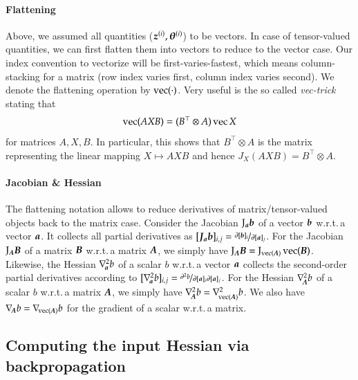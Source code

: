 
\paragraph{Flattening} Above, we assumed all quantities (${\boldsymbol{z}}^{(i)}, {\boldsymbol{\theta}}^{(i)}$) to be vectors.
In case of tensor-valued quantities, we can first flatten them into vectors to reduce to the vector case.
Our index convention to vectorize will be first-varies-fastest, which means column-stacking for a matrix (row index varies first, column index varies second).
We denote the flattening operation by $\operatorname{vec}(\cdot)$.
Very useful is the so called \emph{vec-trick} stating that
\begin{equation}\label{eq:vecTrick}
  \operatorname{vec}(AXB) = (B^\top\otimes A)\operatorname{vec}{X}
\end{equation}
for matrices $A, X, B$. In particular, this shows that $B^\top\otimes A$ is the  matrix representing the linear mapping $X\mapsto AXB$ and hence $J_X(AXB) = B^\top\otimes A$.

\paragraph{Jacobian \& Hessian} The flattening notation allows to reduce derivatives of matrix/tensor-valued objects back to the matrix case.
Consider the Jacobian $\mathrm{J}_{{\boldsymbol{a}}}{\boldsymbol{b}}$ of a vector ${\boldsymbol{b}}$ w.r.t.\,a vector ${\boldsymbol{a}}$.
It collects all partial derivatives as $[{\boldsymbol{J}}_{{\boldsymbol{a}}}{\boldsymbol{b}}]_{i,j} = \nicefrac{\partial [{\boldsymbol{b}}]_i}{\partial [{\boldsymbol{a}}]_j}$.
For the Jacobian $\mathrm{J}_{{\boldsymbol{A}}}{\boldsymbol{B}}$ of a matrix ${\boldsymbol{B}}$ w.r.t.\,a matrix ${\boldsymbol{A}}$, we simply have $\mathrm{J}_{{\boldsymbol{A}}} {\boldsymbol{B}} = \mathrm{J}_{\operatorname{vec}( {\boldsymbol{A}} )}\operatorname{vec}({\boldsymbol{B}})$.
Likewise, the Hessian $\nabla_{\!{{\boldsymbol{a}}}}^{2}b$ of a scalar $b$ w.r.t.\,a vector ${\boldsymbol{a}}$ collects the second-order partial derivatives according to $[\nabla_{\!{{\boldsymbol{a}}}}^{2}b]_{i,j} = \nicefrac{\partial^2 b}{\partial [{\boldsymbol{a}}]_i \partial [{\boldsymbol{a}}]_j}$.
For the Hessian $\nabla_{\!{{\boldsymbol{A}}}}^{2} b$ of a scalar $b$ w.r.t.\,a matrix ${\boldsymbol{A}}$, we simply have $\nabla_{\!{{\boldsymbol{A}}}}^{2} b = \nabla_{\!{\operatorname{vec}({\boldsymbol{A}})}}^{2}b$.
We also have $\nabla_{\!{{\boldsymbol{A}}}} b = \nabla_{\!{\operatorname{vec}({\boldsymbol{A}})}} b$ for the gradient of a scalar w.r.t.\,a matrix.

\subsection{Computing the input Hessian via backpropagation}

